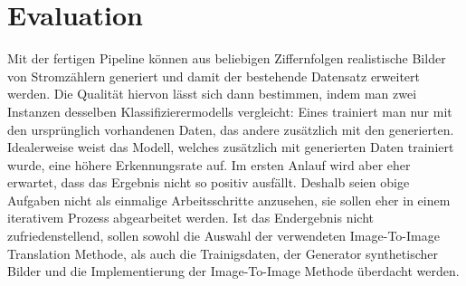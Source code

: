 \section*{Evaluation}
Mit der fertigen Pipeline können aus beliebigen Ziffernfolgen realistische Bilder von Stromzählern generiert und damit der bestehende Datensatz erweitert werden.
Die Qualität hiervon lässt sich dann bestimmen, indem man zwei Instanzen desselben Klassifizierermodells vergleicht: Eines trainiert man nur mit den ursprünglich
vorhandenen Daten, das andere zusätzlich mit den generierten.
Idealerweise weist das Modell, welches zusätzlich mit generierten Daten trainiert wurde, eine höhere Erkennungsrate auf.
Im ersten Anlauf wird aber eher erwartet, dass das Ergebnis nicht so positiv ausfällt. Deshalb seien obige Aufgaben nicht als einmalige Arbeitsschritte anzusehen, 
sie sollen eher in einem iterativem Prozess abgearbeitet werden. Ist das Endergebnis nicht zufriedenstellend, sollen sowohl die Auswahl der verwendeten
Image-To-Image Translation Methode, als auch die Trainigsdaten, der Generator synthetischer Bilder und die Implementierung der Image-To-Image Methode überdacht werden.
